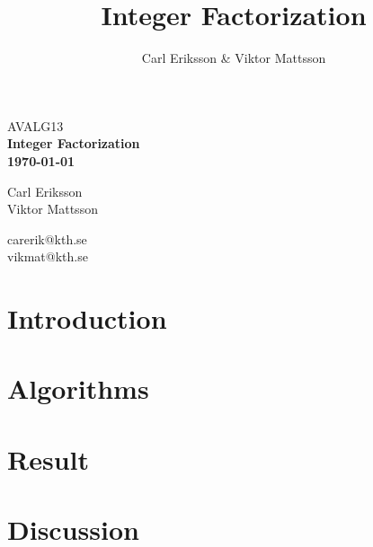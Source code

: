 \documentclass[a4paper,12pt]{article}
\author{Carl Eriksson & Viktor Mattsson}
\begin{document}
\title{Integer Factorization}
    
	\begin{titlepage}
    	\centering
    	\small
    	AVALG13\\
    	\vspace*{6\baselineskip}
    	\Large
    	\bfseries
    	Integer Factorization\\
    	\normalsize
        \textbf{\today} \\[2\baselineskip]

        \begin{minipage}{0.4\textwidth}
        \begin{flushleft} 
        Carl Eriksson\\
        Viktor Mattsson\\
        \end{flushleft}
        \end{minipage}
        \begin{minipage}{0.25\textwidth}
        \begin{flushleft} 
        carerik@kth.se\\
        vikmat@kth.se\\
        \end{flushleft}
        \end{minipage}

        \vspace*{10\baselineskip}
    \end{titlepage}

    \newpage

    \tableofcontents

    \newpage

    \section{Introduction}
        

    \section{Algorithms}
        

    \section{Result}
       

    \section{Discussion}
        


\end{document}
